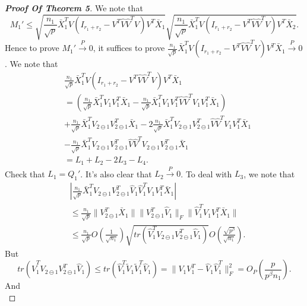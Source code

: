 \begin{proof}[\textbf{Proof Of Theorem 5}]
We note that 
\begin{equation*}
M_1'\leq\sqrt{\frac{n_1}{\sqrt{p}}\bar{X}_1^T V(I_{r_1+r_2}-V^T\hat{V}\hat{V}^T V)V^T \bar{X}_1}\sqrt{\frac{n_1}{\sqrt{p}}\bar{X}_1^T V(I_{r_1+r_2}-V^T\hat{V}\hat{V}^T V)V^T \bar{X}_2}.
\end{equation*}
Hence to prove $M_1'\xrightarrow{P} 0$, it suffices to prove $\frac{n_1}{\sqrt{p}}\bar{X}_1^T V(I_{r_1+r_2}-V^T\hat{V}\hat{V}^T V)V^T \bar{X}_1\xrightarrow{P}0$. 
We note that
\begin{equation*}
\begin{aligned}
&\frac{n_1}{\sqrt{p}}\bar{X}_1^T V(I_{r_1+r_2}-V^T\hat{V}\hat{V}^T V)V^T \bar{X}_1\\
&=(\frac{n_1}{\sqrt{p}}\bar{X}_1^T V_1V_1^T \bar{X}_1-\frac{n_1}{\sqrt{p}}\bar{X}_1^T V_1V_1^T \hat{V}\hat{V}^T V_1 V_1^T \bar{X}_1)
\\
&+\frac{n_1}{\sqrt{p}}\bar{X}_1^T V_{2\ominus 1}V_{2\ominus 1}^T \bar{X}_1-
2\frac{n_1}{\sqrt{p}}\bar{X}_1^T V_{2\ominus 1}V_{2\ominus 1}^T \hat{V}\hat{V}^T V_1 V_1^T \bar{X}_1
\\
&-\frac{n_1}{\sqrt{p}}\bar{X}_1^T V_{2\ominus 1}V_{2\ominus 1}^T \hat{V}\hat{V}^T V_{2\ominus 1}V_{2\ominus 1}^T\bar{X}_1
\\
&=L_1+L_2-2L_3-L_4.
\end{aligned}
\end{equation*}
Check that $L_1=Q_1'$. It's also clear that $L_2\xrightarrow{P}0$. To deal with $L_3$, we note that
\begin{equation}\label{xiaojiqiao1}
\begin{aligned}
    &|\frac{n_1}{\sqrt{p}}\bar{X}_1^T V_{2\ominus 1}V_{2\ominus 1}^T \hat{V}_1\hat{V}_1^T V_1 V_1^T \bar{X}_1|
\\
    &\leq \frac{n_1}{\sqrt{p}}\|V_{2\ominus 1}^T\bar{X}_1\|\|V^T_{2\ominus 1}\hat{V}_1\|_F\|\hat{V}_1^T V_1{V}_1^T\bar{X}_1\|\\
&\leq
\frac{n_1}{\sqrt{p}}O(\frac{1}{\sqrt{n_1}})\sqrt{tr(\hat{V}_1^T V_{2\ominus 1}V_{2\ominus 1}^T\hat{V}_1)}O(\frac{\sqrt{p^{\beta}}}{\sqrt{n_1}}).
\end{aligned}
\end{equation}
But 
\begin{equation*}
tr(\hat{V}_1^T V_{2\ominus 1}V_{2\ominus 1}^T\hat{V}_1)\leq tr(\hat{V}_1^T \tilde{V}_1\tilde{V}_1^T\hat{V}_1)=\|V_1V_1^T- \hat{V}_1\hat{V}_1^T\|_F^2=O_P(\frac{p}{p^{\beta}n_1}).
\end{equation*}
And
\begin{equation}\label{xiaojiqiao2}

\end{equation}
\end{proof}

